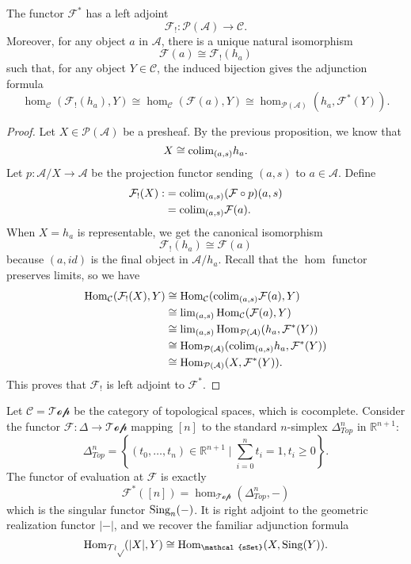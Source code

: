 \begin{proposition}[Kan]
     The functor \(\mathcal{F}^*\) has a left adjoint 
     \[\mathcal{F}_!:\mathcal{P}(\mathcal{A})\rightarrow \mathcal{C}.\]
     Moreover, for any object \(a\) in \(\mathcal{A}\), there is a unique natural isomorphism 
     \[\mathcal{F}(a)\cong \mathcal{F}_!(h_a)\]
     such that, for any object \(Y\in \mathcal{C}\), the induced bijection gives the adjunction formula
     \[\hom_\mathcal{C}(\mathcal{F}_!(h_a),Y)\cong \hom_\mathcal{C}(\mathcal{F}(a),Y)\cong \hom_{\mathcal{P}(\mathcal{A})}(h_a,\mathcal{F}^*(Y)).\]
\end{proposition}
\begin{proof}
    Let \(X\in \mathcal{P}(\mathcal{A})\) be a presheaf. By the previous proposition, we know that 
    \[X\cong \text{colim}_{(a,s)}h_a.\]
    Let \(p:\mathcal{A}/X\rightarrow \mathcal{A}\) be the projection functor sending \((a,s)\) to \(a\in \mathcal{A}\). Define
   \begin{align*}
        \mathcal{F}_!(X):&=\text{colim}_{(a,s)}(\mathcal{F}\circ p)(a,s)\\ 
                         &=\text{colim}_{(a,s)}\mathcal{F}(a).
   \end{align*}
   When \(X=h_a\) is representable, we get the canonical isomorphism 
   \[\mathcal{F}_!(h_a)\cong \mathcal{F}(a)\]
   because \((a,id)\) is the final object in \(\mathcal{A}/h_a\). Recall that the \(\hom\) functor preserves limits, so we have 
    \begin{align*}
         \operatorname{Hom}_\mathcal{C}(\mathcal{F}_!(X),Y)&\cong \operatorname{Hom}_\mathcal{C}(\text{colim}_{(a,s)}\mathcal{F}(a),Y)\\ 
                                             &\cong \text{lim}_{(a,s)}\operatorname{Hom}_\mathcal{C}(\mathcal{F}(a),Y)\\ 
                                            &\cong \text{lim}_{(a,s)}\operatorname{Hom}_{\mathcal{P}(\mathcal{A})}(h_a,\mathcal{F}^*(Y))\\
                                           &\cong \operatorname{Hom}_{\mathcal{P}(\mathcal{A})}(\text{colim}_{(a,s)}h_a,\mathcal{F}^*(Y))\\ 
                                           &\cong \operatorname{Hom}_{\mathcal{P}(\mathcal{A})}(X,\mathcal{F}^*(Y)). 
     \end{align*}
    This proves that \(\mathcal{F}_!\) is left adjoint to \(\mathcal{F}^*\).
\end{proof}

\begin{example}
    Let \(\mathcal{C}=\mathcal{Top}\) be the category of topological spaces, which is cocomplete. Consider the functor \(\mathcal{F}:\Delta\rightarrow \mathcal{Top}\) mapping \([n]\) to the standard \(n\)-simplex \(\Delta^n_{Top}\) in \(\mathbb{R}^{n+1}\):
    \[\Delta^n_{Top}=\left\{ (t_0,\ldots,t_n)\in \mathbb{R}^{n+1}\mid \sum_{i=0}^{n}t_i=1, t_i\geq 0 \right\}.\]
    The functor of evaluation at \(\mathcal{F}\) is exactly 
    \[\mathcal{F}^*([n])=\hom_{\mathcal{Top}}(\Delta^n_{Top},-)\]
    which is the singular functor \(\text{Sing}_n(-)\). It is right adjoint to the geometric realization functor \(|-|\), and we recover the familiar adjunction formula
    \[\hom_{\mathcal{Top}}(|X|,Y)\cong \hom_{\mathcal{sSet}}(X,\t{Sing}(Y)).\] 
\end{example}